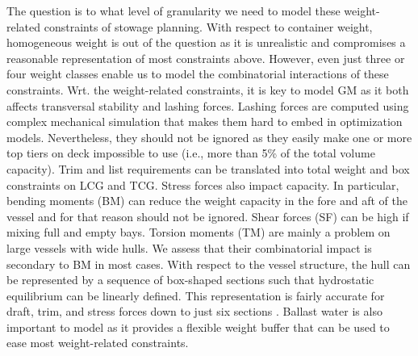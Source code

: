 \documentclass[preprint,12pt,authoryear]{elsarticle}
\begin{document}
The question is to what level of granularity we need to model these weight-related constraints of stowage planning. With respect to container weight, homogeneous weight is out of the question as it is unrealistic and compromises a reasonable representation of most constraints above. However, even just three or four weight classes enable us to model the combinatorial interactions of these constraints. Wrt. the weight-related constraints, it is key to model GM as it both affects transversal stability and lashing forces. Lashing forces are computed using complex mechanical simulation that makes them hard to embed in optimization models. Nevertheless, they should not be ignored as they easily make one or more top tiers on deck impossible to use (i.e., more than 5\% of the total volume capacity). Trim and list requirements can be translated into total weight and box constraints on LCG and TCG. Stress forces also impact capacity. In particular, bending moments (BM) can reduce the weight capacity in the fore and aft of the vessel and for that reason should not be ignored. Shear forces (SF) can be high if mixing full and empty bays. Torsion moments (TM) are mainly a problem on large vessels with wide hulls. We assess that their combinatorial impact is secondary to BM in most cases. With respect to the vessel structure, the hull can be represented by a sequence of box-shaped sections such that hydrostatic equilibrium can be linearly defined. This representation is fairly accurate for draft, trim, and stress forces down to just six sections \cite{Jensen2018TheCapacity}. 
Ballast water is also important to model as it provides a flexible weight buffer that can be used to ease most weight-related constraints. 
\end{document}

